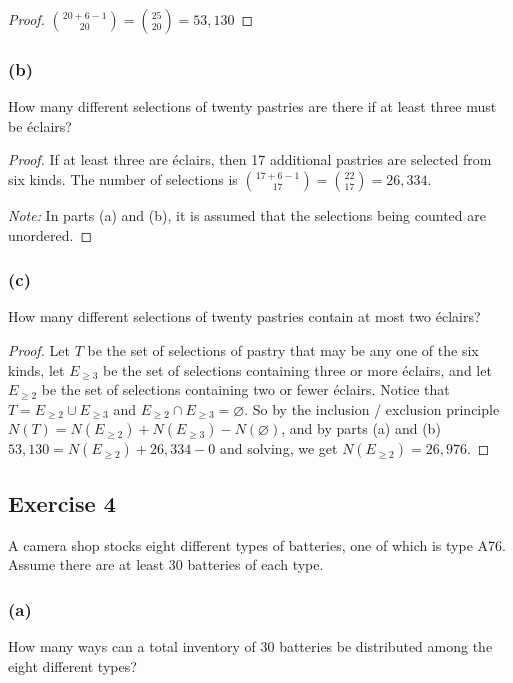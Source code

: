 \documentclass[14pt]{extarticle}
\newcommand{\es}{\varnothing}
\begin{document}
\begin{proof}
\(\binom{20+6-1}{20} = \binom{25}{20} = 53,130\)
\end{proof}

\subsubsection{(b)}
How many different selections of twenty pastries are there if at least three must be éclairs?

\begin{proof}
If at least three are éclairs, then 17 additional pastries are selected from six kinds. The number of selections is 
\(\binom{17+6-1}{17} = \binom{22}{17} = 26,334\).

{\it Note:} In parts (a) and (b), it is assumed that the selections being counted are unordered.
\end{proof}

\subsubsection{(c)}
How many different selections of twenty pastries contain at most two éclairs?

\begin{proof}
Let \(T\) be the set of selections of pastry that may be any one of the six kinds, let \(E_{\geq 3}\) be the set of 
selections containing three or more éclairs, and let \(E_{\geq 2}\) be the set of selections containing two or fewer éclairs. 
Notice that \(T = E_{\geq 2} \cup E_{\geq 3}\) and \(E_{\geq 2} \cap E_{\geq 3} = \es\). So by the inclusion / exclusion 
principle \(N(T) = N(E_{\geq 2}) + N(E_{\geq 3}) - N(\es)\), and by parts (a) and (b) \(53,130=N(E_{\geq 2}) + 26,334 - 0\) 
and solving, we get \(N(E_{\geq 2}) = 26,976\).
\end{proof}

\subsection{Exercise 4}
A camera shop stocks eight different types of batteries, one of which is type A76. Assume there are at least 30 batteries 
of each type.

\subsubsection{(a)}
How many ways can a total inventory of 30 batteries be distributed among the eight different types?
\end{document}
